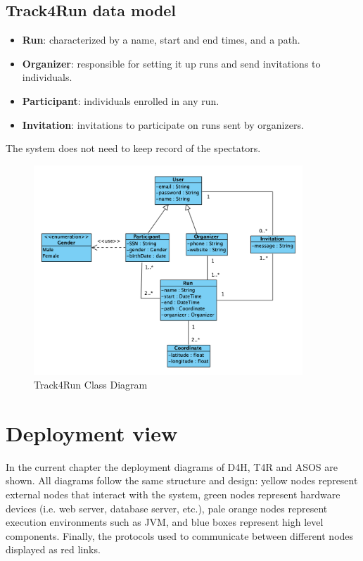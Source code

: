\documentclass[a4paper, hidelinks, 12pt]{report}
\begin{document}
	\subsection{Track4Run data model}
	\begin{itemize}
		\item{\textbf{Run}}:  characterized by a name, start and end times, and a path.
		\item{\textbf{Organizer}}: responsible for setting it up runs and send invitations to individuals.
		\item {\textbf{Participant}}: individuals enrolled in any run.
		\item {\textbf{Invitation}}: invitations to participate on runs sent by organizers.
	\end{itemize}
	
	The system does not need to keep record of the spectators. \\
	
	\begin{figure}[H]
    		\centering
		\includegraphics[width=0.9\textwidth]{diagrams/t4r_class_diagram.png}
		\caption[Track4Run Class Diagram]{Track4Run Class Diagram}
		\label{fig:Track4Run Class Diagram}
	\end{figure}	
			
	\section{Deployment view}
	In the current chapter the deployment diagrams of D4H, T4R and ASOS are shown. All diagrams follow the same structure and design: yellow nodes represent external nodes that interact with the system, green nodes represent hardware devices (i.e. web server, database server, etc.), pale orange nodes represent execution environments such as JVM, and blue boxes represent high level components. Finally, the protocols used to communicate between different nodes displayed as red links.
	
\end{document}
